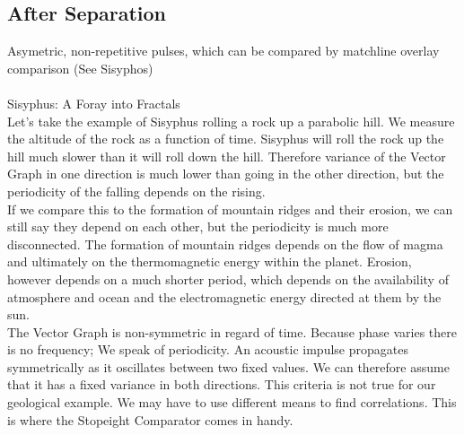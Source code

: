 \documentclass{report}
\begin{document}
\subsection*{After Separation}
Asymetric, non-repetitive pulses, which can be compared by matchline overlay comparison (See Sisyphos)\\\\
Sisyphus: A Foray into Fractals\\
Let's take the example of Sisyphus rolling a rock up a parabolic hill. We measure the altitude of the rock as a function of time. Sisyphus will roll the rock up the hill much slower than it will roll down the hill. Therefore variance of the Vector Graph in one direction is much lower than going in the other direction, but the periodicity of the falling depends on the rising.\\
If we compare this to the formation of mountain ridges and their erosion, we can still say they depend on each other, but the periodicity is much more disconnected. The formation of mountain ridges depends on the flow of magma and ultimately on the thermomagnetic energy within the planet. Erosion, however depends on a much shorter period, which depends on the availability of atmosphere and ocean and the electromagnetic energy directed at them by the sun.\\
The Vector Graph is non-symmetric in regard of time. Because phase varies there is no frequency; We speak of periodicity. An acoustic impulse propagates symmetrically as it oscillates between two fixed values. We can therefore assume that it has a fixed variance in both directions. This criteria is not true for our geological example. We may have to use different means to find correlations. This is where the Stopeight Comparator comes in handy.\\


\iffalse
\printbibliography
\fi
{}

\end{document}
